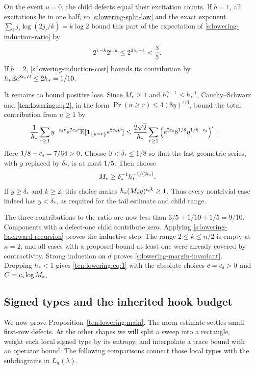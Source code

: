 On the event $u=0$, the child defects equal their excitation counts.
If $b=1$, all excitations lie in one half, so
\eqref{s:lowering-split-law} and the exact exponent
$\sum_i j_i\log(2j_i/k)=k\log2$ bound this part of the expectation
of \eqref{s:lowering-induction-ratio} by
\[
 2^{1-k}2^{c_{\rm s}k}
 \le2^{2c_{\rm s}-1}<\frac35.
\]
If $b=2$, \eqref{s:lowering-induction-cost} bounds its contribution by
$h_*\mathbb E e^{8c_{\rm s}D}\le2h_*=1/10$.

It remains to bound positive loss.  Since $M_*\ge1$ and
$h_*^{b-1}\le h_*^{-1}$, Cauchy--Schwarz and
\eqref{ten:lowering:eq:2}, in the form
$\Pr(u\ge r)\le4(8y)^{r/4}$, bound the total contribution from
$u\ge1$ by
\begin{align*}
 \frac1{h_*}\sum_{r\ge1}y^{-c_{\rm s}r}e^{2c_{\rm s}r}
       \mathbb E[\mathbf1_{\{u=r\}}e^{8c_{\rm s}D}]
 &\le\frac{2\sqrt2}{h_*}\sum_{r\ge1}
   \left(e^{2c_{\rm s}}8^{1/8}y^{1/8-c_{\rm s}}\right)^r.
\end{align*}
Here $1/8-c_{\rm s}=7/64>0$.  Choose $0<\delta_*\le1/8$ so that
the last geometric series, with $y$ replaced by $\delta_*$, is at
most $1/5$.  Then choose
\[
 M_*\ge\delta_*^{-1}h_*^{-1/(2c_{\rm s})}.
\]
If $y\ge\delta_*$ and $k\ge2$, this choice makes
$h_*(M_*y)^{c_{\rm s}k}\ge1$.  Thus every nontrivial case indeed
has $y<\delta_*$, as required for the tail estimate and child range.

The three contributions to the ratio are now less than
$3/5+1/10+1/5=9/10$.  Components with a defect-one child contribute
zero.  Applying \eqref{s:lowering-backward-recursion} proves the
inductive step.  The range $2\le k\le n/2$ is empty at $n=2$,
and all cases with a proposed bound at least one were already covered
by contractivity.  Strong induction on $d$ proves
\eqref{s:lowering-margin-invariant}.  Dropping $h_*<1$ gives
\eqref{ten:lowering:eq:1} with the absolute choices
$c=c_{\rm s}>0$ and $C=c_{\rm s}\log M_*$.

\subsection{Signed types and the inherited hook budget}

We now prove Proposition~\ref{ten:lowering:main}. The norm estimate
settles small first-row defects. At the other shapes we will split a
sweep into a rectangle, weight each local signed type by its entropy,
and interpolate a trace bound with an operator bound. The following
comparisons connect those local types with the subdiagrams in
$L_n(\lambda)$.

